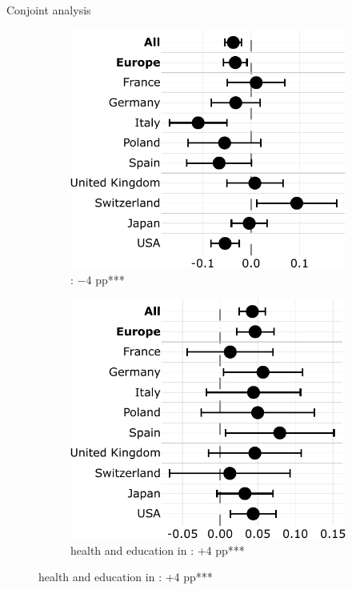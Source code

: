 \documentclass[aspectratio=169,xcolor=dvipsnames, 11pt,mathserif]{beamer}
\begin{document}
\begin{frame}{Conjoint analysis} 
    \begin{figure}
\caption{ the  political  of containing the following policy%
} \vspace{-.4cm}
\begin{subfigure}{.48\textwidth}
  \caption[]{: $-$4 pp*** \quad {}}\vspace{-.3cm}
  \includegraphics[width=\textwidth]{../figures/country_comparison/program_preferred_by_cut_aid_in_program.pdf}
\end{subfigure} \pause
\begin{subfigure}{.50\textwidth}
  \caption[]{ health and education in : +4 pp*** \quad {}} \vspace{-.3cm}
  \includegraphics[width=.95\textwidth]{../figures/country_comparison/program_preferred_by_millionaire_tax_in_program.pdf}

\end{subfigure}
\end{figure}
\end{frame}
\end{document}
